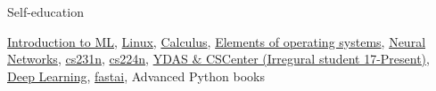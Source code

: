 \documentclass{resume} %
\begin{document}
\vspace{-1.5\baselineskip}
\begin{rSection}{Self-education}

\href{https://www.coursera.org/learn/vvedenie-mashinnoe-obuchenie}{Introduction to ML}, \href{https://stepik.org/course/73}{Linux}, \href{https://stepik.org/course/95}{Calculus}, \href{https://stepik.org/course/253}{Elements of operating systems}, \href{https://stepik.org/course/401/}{Neural Networks}, \href{http://cs231n.stanford.edu/}{cs231n}, \href{http://web.stanford.edu/class/cs224n/}{cs224n}, \href{https://yandexdataschool.ru}{YDAS \& CSCenter (Irregural student 17-Present)}, \href{https://www.deeplearningbook.org}{Deep Learning}, \href{http://course.fast.ai}{fastai}, Advanced Python books

\end{rSection} 
\end{document}
